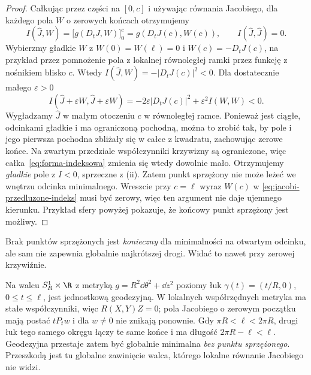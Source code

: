 \begin{proof}
Całkując przez części na $[0,c]$ i używając
równania Jacobiego, dla każdego pola $W$
o zerowych końcach otrzymujemy
\begin{equation}\label{eq:jacobi-przedluzone-indeks}
 I(\widehat J,W)
 =\bigl[g(D_tJ,W)\bigr]_0^c
 =g(D_tJ(c),W(c)),
 \qquad I(\widehat J,\widehat J)=0.
\end{equation}
Wybierzmy gładkie $W$ z $W(0)=W(\ell)=0$
i $W(c)=-D_tJ(c)$, na przykład przez
pomnożenie pola z lokalnej równoległej ramki
przez funkcję z nośnikiem blisko $c$.
Wtedy $I(\widehat J,W)=-|D_tJ(c)|^2<0$.
Dla dostatecznie małego $\varepsilon>0$
\[
 I(\widehat J+\varepsilon W,
   \widehat J+\varepsilon W)
 =-2\varepsilon|D_tJ(c)|^2
       +\varepsilon^2 I(W,W)<0.
\]
Wygładzamy $\widehat J$ w małym otoczeniu $c$
w równoległej ramce. Ponieważ jest ciągłe,
odcinkami gładkie i ma ograniczoną pochodną,
można to zrobić tak, by pole i jego pierwsza
pochodna zbliżały się w całce z kwadratu,
zachowując zerowe końce. Na zwartym przedziale
współczynniki krzywizny są ograniczone,
więc całka~\eqref{eq:forma-indeksowa}
zmienia się wtedy dowolnie mało. Otrzymujemy
\emph{gładkie} pole z $I<0$, sprzeczne z (ii).
Zatem punkt sprzężony nie może leżeć
we wnętrzu odcinka minimalnego.
Wreszcie przy $c=\ell$ wyraz $W(c)$ w
\eqref{eq:jacobi-przedluzone-indeks} musi
być zerowy, więc ten argument nie daje
ujemnego kierunku. Przykład sfery powyżej
pokazuje, że końcowy punkt sprzężony jest
możliwy.
\end{proof}

Brak punktów sprzężonych jest \emph{konieczny}
dla minimalności na otwartym odcinku,
ale sam nie zapewnia globalnie najkrótszej drogi.
Widać to nawet przy zerowej krzywiźnie.

\begin{przyklad}
\label{prz:jacobi-plaski-walec}
Na walcu $S_R^1\times\R$ z metryką
$g=R^2\dd\theta^2+\dd z^2$ poziomy łuk
$\gamma(t)=(t/R,0)$, $0\leq t\leq\ell$,
jest jednostkową geodezyjną. W lokalnych
współrzędnych metryka ma stałe współczynniki,
więc $R(X,Y)Z=0$; pola Jacobiego o zerowym
początku mają postać $tP_tw$ i dla $w\ne0$ nie znikają
ponownie. Gdy $\pi R<\ell<2\pi R$, drugi
łuk tego samego okręgu łączy te same końce
i ma długość $2\pi R-\ell<\ell$.
Geodezyjna przestaje zatem być globalnie
minimalna \emph{bez punktu sprzężonego}.
Przeszkodą jest tu globalne zawinięcie walca,
którego lokalne równanie Jacobiego nie widzi.
\end{przyklad}

